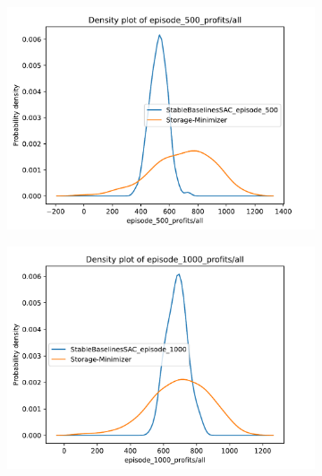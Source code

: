 \begin{figure}
	\centering
	\begin{subfigure}{0.49\textwidth}
		\centering
		\includegraphics[width = \textwidth]{images/experiments/SACDuopoly/SACDuopolyProfitsDensity1.pdf}\\
		\label{fig:SACDuopolyProfitsDensity1}
	\end{subfigure}
	\begin{subfigure}{0.49\textwidth}
		\centering
		\includegraphics[width = \textwidth]{images/experiments/SACDuopoly/SACDuopolyProfitsDensity2.pdf}\\
		\label{fig:SACDuopolyProfitsDensity2}
	\end{subfigure}

\end{figure}
